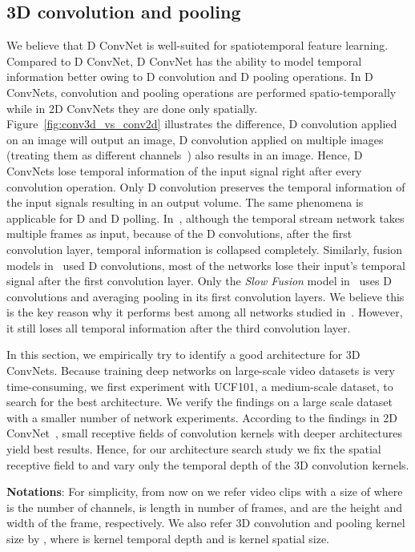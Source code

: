 \documentclass[10pt,twocolumn,letterpaper]{article}
\begin{document}
\subsection{3D convolution and pooling}
We believe that D ConvNet is well-suited for spatiotemporal feature learning. Compared to D ConvNet, D ConvNet has the ability to model temporal information better owing to D convolution and D pooling operations. In D ConvNets, convolution and pooling operations are performed spatio-temporally while in 2D ConvNets they are done only spatially. Figure~\ref{fig:conv3d_vs_conv2d} illustrates the difference, D convolution applied on an image will output an image, D convolution applied on multiple images (treating them as different channels~\cite{SimonyanZ14}) also results in an image. Hence, D ConvNets lose temporal information of the input signal right after every convolution operation. Only D convolution preserves the temporal information of the input signals resulting in an output volume. The same phenomena is applicable for D and D polling.  In~\cite{SimonyanZ14}, although the temporal stream network takes multiple frames as input, because of the D convolutions, after the first convolution layer, temporal information is collapsed completely. Similarly, fusion models in~\cite{Karpathy14} used D convolutions, most of the networks lose their input's temporal signal after the first convolution layer. Only the \emph{Slow Fusion} model in~\cite{Karpathy14} uses D convolutions and averaging pooling in its first  convolution layers. We believe this is the key reason why it performs best among all networks studied in~\cite{Karpathy14}. However, it still loses all temporal information after the third convolution layer.

In this section, we empirically try to identify a good architecture for 3D ConvNets. Because training deep networks on large-scale video datasets is very time-consuming, we first experiment with UCF101, a medium-scale dataset, to search for the best architecture. We verify the findings on a large scale dataset with a smaller number of network experiments. According to the findings in 2D ConvNet~\cite{SimonyanZ14a}, small receptive fields of  convolution kernels with deeper architectures yield best results. Hence, for our architecture search study we fix the spatial receptive field to  and vary only the temporal depth of the 3D convolution kernels.

{\bf Notations}: For simplicity, from now on we refer video clips with a size of  where  is the number of channels,  is length in number of frames,  and  are the height and width of the frame, respectively. We also refer 3D convolution and pooling kernel size by , where  is kernel temporal depth and  is kernel spatial size. 
\end{document}
